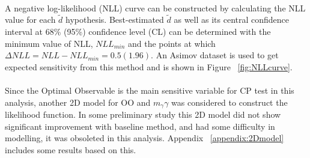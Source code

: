\paragraph{} A negative log-likelihood (NLL) curve can be constructed by calculating the NLL value for each $\tilde{d}$ hypothesis. Best-estimated $\tilde{d}$ as well as its central confidence interval at 68\% (95\%) confidence level (CL) can be determined with the minimum value of NLL, $NLL_{min}$ and the points at which $\Delta NLL = NLL-NLL_{min} = 0.5(1.96)$. An Asimov dataset is used to get expected sensitivity from this method and is shown in Figure ~\ref{fig:NLLcurve}. 


\paragraph{} Since the Optimal Observable is the main sensitive variable for CP test in this analysis, another 2D model for OO and $m_\gamma\gamma$ was considered to construct the likelihood function. In some preliminary study this 2D model did not show significant improvement with baseline method, and had some difficulty in modelling, it was obsoleted in this analysis. Appendix ~\ref{appendix:2Dmodel} includes some results based on this. 


